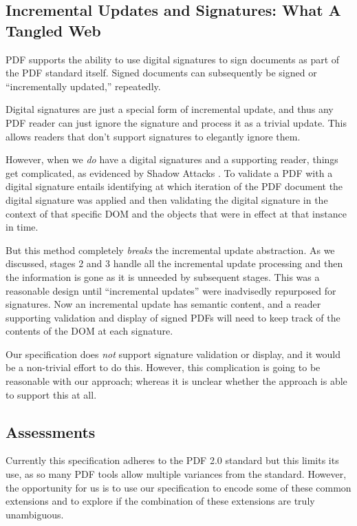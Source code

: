 \subsection{Incremental Updates and Signatures: What A Tangled Web}
\label{sec:updates-and-signatures}

PDF supports the ability to use digital signatures to sign documents
as part of the PDF standard itself.  Signed documents can
subsequently be signed or ``incrementally updated,'' repeatedly.

Digital signatures are just a special form of incremental update, and
thus any PDF reader can just ignore the signature and process it as a
trivial update.  This allows readers that don't support signatures to
elegantly ignore them.

However, when we \emph{do} have a digital signatures and a supporting
reader, things get complicated, as evidenced by Shadow Attacks
\cite{mladenovTrillionDollarRefund2019,ndsssymposiumNDSS2021Shadow2021}.
%
To validate a PDF with a digital signature entails identifying at
which iteration of the PDF document the digital signature was applied
and then validating the digital signature in the context of that
specific DOM and the objects that were in effect at that instance in
time.

But this method completely \emph{breaks} the incremental update
abstraction.  As we discussed, stages 2 and 3 handle all
the incremental update processing and then the information is gone as
it is unneeded by subsequent stages.
% 
This was a reasonable design until ``incremental updates'' were
inadvisedly repurposed for signatures.  Now an incremental update has
semantic content, and a reader supporting validation and display of
signed PDFs will need to keep track of the contents of the DOM at each
signature.

Our specification does \emph{not} support signature validation or
display, and it would be a non-trivial effort to do this.  However,
this complication is going to be reasonable with our \ssp{} approach;
whereas it is unclear whether the \dsp{} approach is able to support
this at all.


\subsection{Assessments}

Currently this specification adheres to the PDF 2.0 standard but this
limits its use, as so many PDF tools allow multiple variances from the
standard.
%
However, the opportunity for us is to use our specification to encode
some of these common extensions and to explore if the combination of
these extensions are truly unambiguous.

